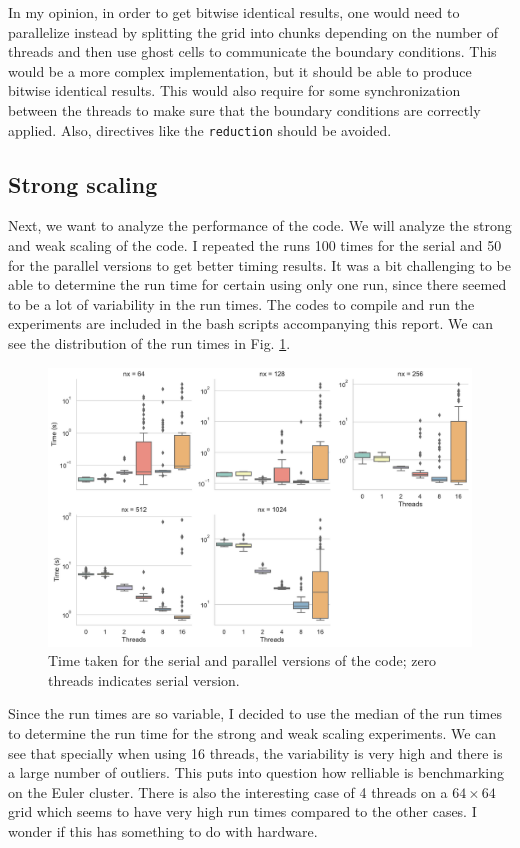 \documentclass[unicode,11pt,a4paper,oneside,numbers=endperiod,openany]{scrartcl}
\begin{document}
In my opinion, in order to get bitwise identical results, one
would need to parallelize instead by splitting the grid into chunks depending on
the number of threads and then use
ghost cells to communicate the boundary conditions. This would be a more complex
implementation, but it should be able to produce bitwise identical results. This
would also require for some synchronization between the threads to make sure
that the boundary conditions are correctly applied. Also, directives like
the \texttt{reduction} should be avoided.

\subsection*{Strong scaling}
Next, we want to analyze the performance of the code. We will analyze the strong
and weak scaling of the code. I repeated the runs 100 times for the serial and
50 for the parallel
versions to get better timing results.
It was a bit challenging to be able to determine the run time for certain using
only one run, since there seemed to be a lot of variability in the run times.
The codes to compile and run the experiments are included in the bash scripts
accompanying this report. We can see the distribution of the run times in Fig. \ref{im:times}.
\begin{figure}[!h]
    \centering
    \includegraphics[width=\textwidth]{../mini_app/data_var.pdf}
    \caption{Time taken for the serial and parallel versions of the code; zero threads indicates serial version.}
    \label{im:times}
\end{figure}
Since the run times are so variable, I decided to use the median of the run
times
to determine the run time for the strong and weak scaling experiments. We can
see that specially when using 16 threads, the variability is very high and there
is a large number of outliers. This puts into question how relliable is
benchmarking on the Euler cluster. There is also the interesting case of 4
threads on a $64\times64$ grid which seems to have very high run times compared
to the other cases. I wonder if this has something to do with hardware.
\end{document}

